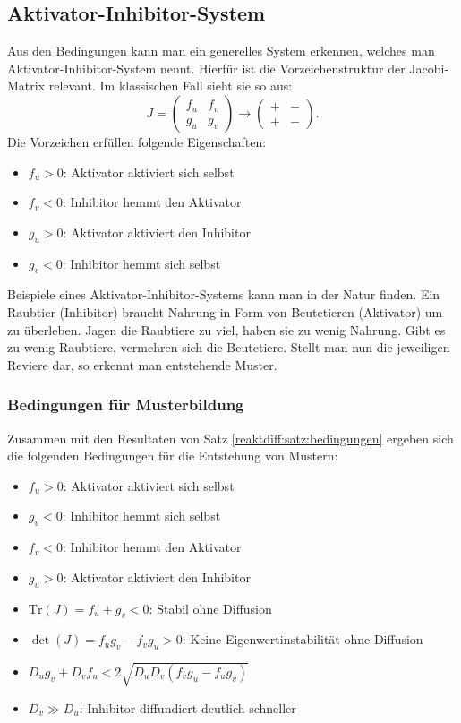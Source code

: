 \subsection{Aktivator-Inhibitor-System}
Aus den Bedingungen kann man ein generelles System erkennen, welches man Aktivator-Inhibitor-System nennt.
Hierfür ist die Vorzeichenstruktur der Jacobi-Matrix relevant.
Im klassischen Fall sieht sie so aus:
\begin{equation*}
        J =
    \begin{pmatrix}
        f_u & f_v\\
        g_u & g_v
    \end{pmatrix} 
    \rightarrow
    \begin{pmatrix}
        + & -\\
        + & -
    \end{pmatrix}.
\end{equation*}
Die Vorzeichen erfüllen folgende Eigenschaften:
\begin{itemize}
    \item \(f_u > 0\): Aktivator aktiviert sich selbst
    \item \(f_v < 0\): Inhibitor hemmt den Aktivator
    \item \(g_u > 0\): Aktivator aktiviert den Inhibitor
    \item \(g_v < 0\): Inhibitor hemmt sich selbst
\end{itemize}
%
%
Beispiele eines Aktivator-Inhibitor-Systems kann man in der Natur finden.
Ein Raubtier (Inhibitor) braucht Nahrung in Form von Beutetieren (Aktivator) um zu überleben.
%
%
Jagen die Raubtiere zu viel, haben sie zu wenig Nahrung.
Gibt es zu wenig Raubtiere, vermehren sich die Beutetiere.
Stellt man nun die jeweiligen Reviere dar, so erkennt man entstehende Muster.
%

\subsubsection{Bedingungen für Musterbildung}
Zusammen mit den Resultaten von Satz \ref{reaktdiff:satz:bedingungen} ergeben sich die folgenden Bedingungen für die Entstehung von Mustern:
        \begin{itemize}
            \item \(f_u > 0\): Aktivator aktiviert sich selbst
            \item \(g_v < 0\): Inhibitor hemmt sich selbst
            \item \(f_v < 0\): Inhibitor hemmt den Aktivator
            \item \(g_u > 0\): Aktivator aktiviert den Inhibitor
            \item \(\text{Tr}(J) = f_u + g_v < 0\): Stabil ohne Diffusion
            \item \(\det(J) = f_u g_v - f_v g_u > 0\): Keine Eigenwertinstabilität ohne Diffusion
            \item \(D_u g_v + D_v f_u < 2\!\sqrt{D_u D_v (f_v g_u - f_u g_v)}\)
            \item \(D_v \gg D_u\): Inhibitor diffundiert deutlich schneller
        \end{itemize}

